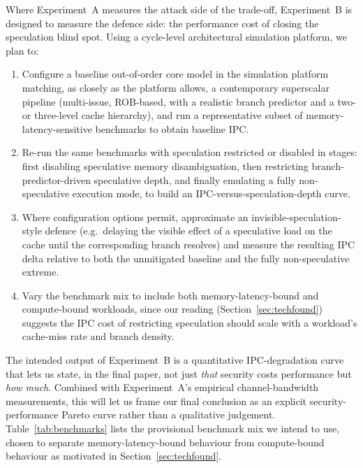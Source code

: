 \documentclass[11pt,a4paper]{article}
\begin{document}
Where Experiment~A measures the attack side of the trade-off, Experiment~B is
designed to measure the defence side: the performance cost of closing the
speculation blind spot. Using a cycle-level architectural simulation platform, we plan to:

\begin{enumerate}[nosep]
\item Configure a baseline out-of-order core model in the simulation platform matching, as
closely as the platform allows, a contemporary superscalar pipeline
(multi-issue, ROB-based, with a realistic branch predictor and a two- or
three-level cache hierarchy), and run a representative subset of memory-latency-sensitive
benchmarks to obtain baseline IPC.
\item Re-run the same benchmarks with speculation restricted or disabled in
stages: first disabling speculative memory disambiguation, then restricting
branch-predictor-driven speculative depth, and finally emulating a fully
non-speculative execution mode, to build an IPC-versus-speculation-depth
curve.
\item Where configuration options permit, approximate an invisible-speculation-style
defence (e.g.\ delaying the visible effect of a speculative load on the cache
until the corresponding branch resolves) and measure the resulting IPC delta
relative to both the unmitigated baseline and the fully non-speculative
extreme.
\item Vary the benchmark mix to include both memory-latency-bound and
compute-bound workloads, since our reading (Section~\ref{sec:techfound})
suggests the IPC cost of restricting speculation should scale with a
workload's cache-miss rate and branch density.
\end{enumerate}

The intended output of Experiment~B is a quantitative IPC-degradation curve
that lets us state, in the final paper, not just \emph{that} security costs
performance but \emph{how much}. Combined with Experiment~A's empirical
channel-bandwidth measurements, this will let us frame our final conclusion
as an explicit security-performance Pareto curve rather than a qualitative
judgement. Table~\ref{tab:benchmarks} lists the provisional benchmark mix we
intend to use, chosen to separate memory-latency-bound behaviour from
compute-bound behaviour as motivated in Section~\ref{sec:techfound}.
\end{document}
